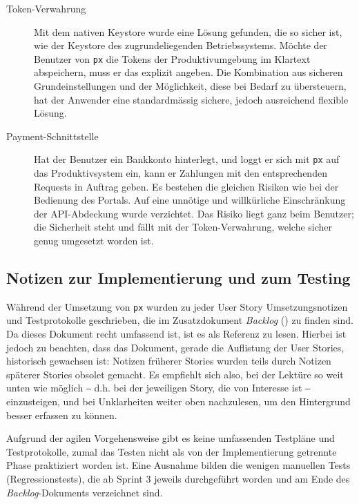 \begin{description}
    \item[Token-Verwahrung] Mit dem nativen Keystore wurde eine Lösung gefunden, die so sicher ist, wie der Keystore des zugrundeliegenden Betriebssystems. Möchte der Benutzer von \texttt{px} die Tokens der Produktivumgebung im Klartext abspeichern, muss er das explizit angeben. Die Kombination aus sicheren Grundeinstellungen und der Möglichkeit, diese bei Bedarf zu übersteuern, hat der Anwender eine standardmässig sichere, jedoch ausreichend flexible Lösung.
    \item[Payment-Schnittstelle] Hat der Benutzer ein Bankkonto hinterlegt, und loggt er sich mit \texttt{px} auf das Produktivsystem ein, kann er Zahlungen mit den entsprechenden Requests in Auftrag geben. Es bestehen die gleichen Risiken wie bei der Bedienung des Portals. Auf eine unnötige und willkürliche Einschränkung der API-Abdeckung wurde verzichtet. Das Risiko liegt ganz beim Benutzer; die Sicherheit steht und fällt mit der Token-Verwahrung, welche sicher genug umgesetzt worden ist.
\end{description}

\subsection{Notizen zur Implementierung und zum Testing}

Während der Umsetzung von \texttt{px} wurden zu jeder User Story Umsetzungsnotizen und Testprotokolle geschrieben, die im Zusatzdokument \textit{Backlog} () zu finden sind. Da dieses Dokument recht umfassend ist, ist es als Referenz zu lesen. Hierbei ist jedoch zu beachten, dass das Dokument, gerade die Auflistung der User Stories, historisch gewachsen ist: Notizen früherer Stories wurden teils durch Notizen späterer Stories obsolet gemacht. Es empfiehlt sich also, bei der Lektüre so weit unten wie möglich ‒ d.h. bei der jeweiligen Story, die von Interesse ist ‒ einzusteigen, und bei Unklarheiten weiter oben nachzulesen, um den Hintergrund besser erfassen zu können.

Aufgrund der agilen Vorgehensweise gibt es keine umfassenden Testpläne und Testprotokolle, zumal das Testen nicht als von der Implementierung getrennte Phase praktiziert worden ist. Eine Ausnahme bilden die wenigen manuellen Tests (Regressionstests), die ab Sprint 3 jeweils durchgeführt worden und am Ende des \textit{Backlog}-Dokuments verzeichnet sind.
